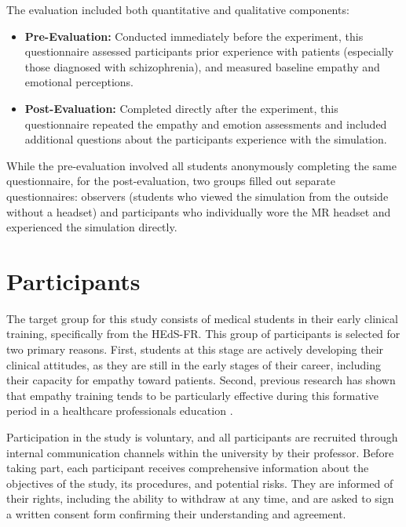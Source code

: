 \vspace{3em}

The evaluation included both quantitative and qualitative components:

\begin{itemize}
  \item \textbf{Pre-Evaluation:} Conducted immediately before the experiment, this questionnaire assessed participants prior experience with patients (especially those diagnosed with schizophrenia), and measured baseline empathy and emotional perceptions.
  \item \textbf{Post-Evaluation:} Completed directly after the experiment, this questionnaire repeated the empathy and emotion assessments and included additional questions about the participants experience with the simulation.
\end{itemize}

While the pre-evaluation involved all students anonymously completing the same questionnaire, for the post-evaluation, two groups filled out separate questionnaires: observers (students who viewed the simulation from the outside without a headset) and participants who individually wore the MR headset and experienced the simulation directly.


\section{Participants}

The target group for this study consists of medical students in their early clinical training, specifically from the HEdS-FR. This group of participants is selected for two primary reasons. First, students at this stage are actively developing their clinical attitudes, as they are still in the early stages of their career, including their capacity for empathy toward patients. Second, previous research has shown that empathy training tends to be particularly effective during this formative period in a healthcare professionals education \cite{Hsia2022, Kuhail2022}.

\vspace{1em}

Participation in the study is voluntary, and all participants are recruited through internal communication channels within the university by their professor. Before taking part, each participant receives comprehensive information about the objectives of the study, its procedures, and potential risks. They are informed of their rights, including the ability to withdraw at any time, and are asked to sign a written consent form confirming their understanding and agreement.


